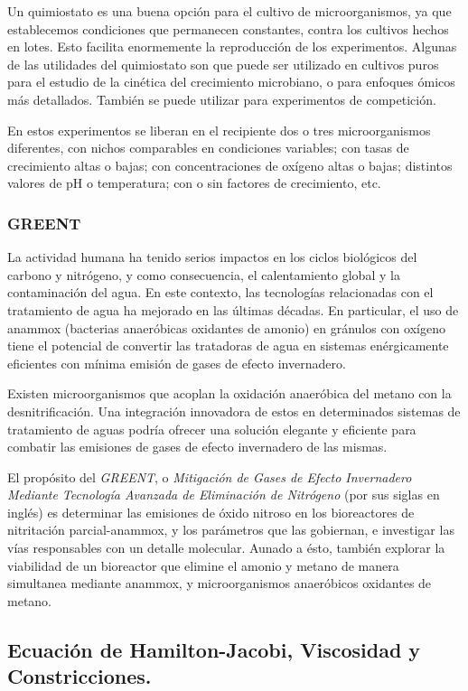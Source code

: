 Un quimiostato es una buena opción para el cultivo de microorganismos, ya que establecemos condiciones que permanecen constantes, contra los cultivos hechos en lotes. Esto facilita enormemente la reproducción de los experimentos. Algunas de las utilidades del quimiostato son que puede ser utilizado en cultivos puros para el estudio de la cinética del crecimiento microbiano, o para enfoques ómicos más detallados. También se puede utilizar para experimentos de competición.

En estos experimentos se liberan en el recipiente dos o tres microorganismos diferentes, con nichos comparables en condiciones variables; con tasas de crecimiento altas o bajas; con concentraciones de oxígeno altas o bajas; distintos valores de pH o temperatura; con o sin factores de crecimiento, etc.

\subsubsection{GREENT}

La  actividad humana ha tenido serios impactos en los ciclos biológicos del carbono y nitrógeno, y como consecuencia, el calentamiento global y la contaminación del agua. En este contexto, las tecnologías relacionadas con el tratamiento de agua ha mejorado en las últimas décadas. En particular, el uso de anammox (bacterias anaeróbicas oxidantes de amonio) en gránulos con oxígeno tiene el potencial de convertir las tratadoras de agua en sistemas enérgicamente eficientes con mínima emisión de gases de efecto invernadero.

Existen microorganismos que acoplan la oxidación anaeróbica del metano con la desnitrificación. Una integración innovadora de estos en determinados sistemas de tratamiento de aguas podría ofrecer una solución elegante y eficiente para combatir las emisiones de gases de efecto invernadero de las mismas.

El propósito del \textit{GREENT}, o \textit{Mitigación de Gases de Efecto Invernadero Mediante Tecnología Avanzada de Eliminación de Nitrógeno} (por sus siglas en inglés) es determinar las emisiones de óxido nitroso en los bioreactores de nitritación parcial-anammox, y los parámetros que las gobiernan, e investigar las vías responsables con un detalle molecular. Aunado a ésto, también explorar la viabilidad de un bioreactor que elimine el amonio y metano de manera simultanea mediante anammox, y microorganismos anaeróbicos oxidantes de metano.

\subsection{Ecuación de Hamilton-Jacobi, Viscosidad y Constricciones.}